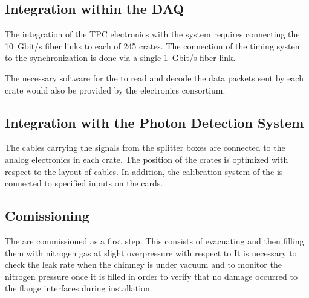 \subsection{Integration within the DAQ}
\label{sec:fddp-tpc-elec-install-daq}
The integration of the \dual TPC electronics with the  system requires connecting the \SI{10}{Gbit/s} fiber links to each of \num{245}  crates. The connection of the timing system to the synchronization  is done via a single \SI{1}{Gbit/s} fiber link. 

The necessary software for the  to read and decode the data packets sent by each  crate would also be provided by the electronics consortium.   

\subsection{Integration with the Photon Detection System}
\label{sec:fddp-tpc-elec-install-pmt}
The cables carrying the  signals from the splitter boxes %
are connected to the  analog electronics in each  crate. The position of the crates %
is optimized with respect to the layout of  cables. In addition, the calibration system of the  %
is connected to specified inputs on the cards.



\subsection{Comissioning}
\label{sec:fddp-tpc-elec-comission}

The  are commissioned as a first step. This consists of evacuating and then filling them with nitrogen gas at slight overpressure with respect to %
It is necessary to check the leak rate when the chimney is under vacuum and to monitor the nitrogen pressure once it is filled in order to verify that no damage occurred to the flange interfaces during installation.

